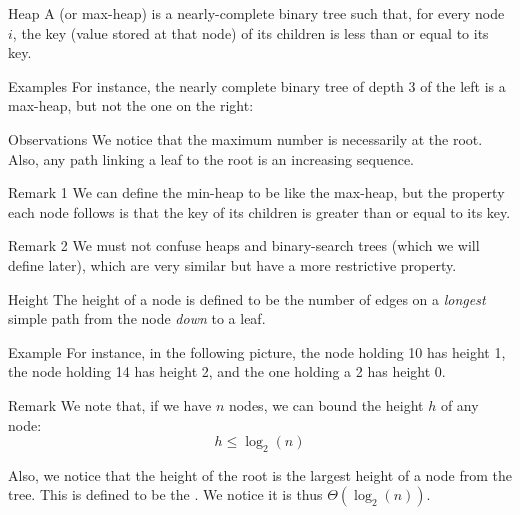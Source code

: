 \documentclass[a4paper]{article}
\begin{document}
\begin{parag}{Heap}
    A  (or max-heap) is a nearly-complete binary tree such that, for every node $i$, the key (value stored at that node) of its children is less than or equal to its key.

    \begin{subparag}{Examples}
        For instance, the nearly complete binary tree of depth 3 of the left is a max-heap, but not the one on the right:
    \end{subparag}
    

    \begin{subparag}{Observations}
        We notice that the maximum number is necessarily at the root. Also, any path linking a leaf to the root is an increasing sequence.
    \end{subparag}

    \begin{subparag}{Remark 1}
        We can define the min-heap to be like the max-heap, but the property each node follows is that the key of its children is greater than or equal to its key.
    \end{subparag}

    \begin{subparag}{Remark 2}
        We must not confuse heaps and binary-search trees (which we will define later), which are very similar but have a more restrictive property. 
    \end{subparag}
\end{parag}

\begin{parag}{Height}
    The height of a node is defined to be the number of edges on a \textit{longest} simple path from the node \textit{down} to a leaf.

    \begin{subparag}{Example}
        For instance, in the following picture, the node holding 10 has height 1, the node holding 14 has height 2, and the one holding a 2 has height 0.
    \end{subparag}

    \begin{subparag}{Remark}
        We note that, if we have $n$ nodes, we can bound the height $h$ of any node: 
        \[h \leq \log_2\left(n\right)\]

        Also, we notice that the height of the root is the largest height of a node from the tree. This is defined to be the . We notice it is thus $\Theta\left(\log_2\left(n\right)\right)$.
    \end{subparag}
\end{parag}
\end{document}
